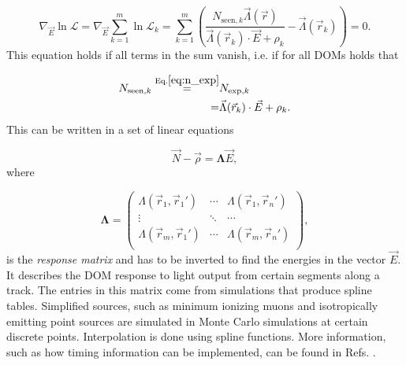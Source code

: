 \begin{equation}
\nabla_{\vec{E}} \ln \mathcal{L} = \nabla_{\vec{E}} \sum^m_{k=1} \ln \mathcal{L}_k = \sum^m_{k=1} \left(\frac{N_{\textrm{seen},k} \vec{\Lambda}(\vec{r})}{\vec{\Lambda}(\vec{r}_k) \cdot \vec{E} + \rho_k} - \vec{\Lambda}(\vec{r}_k) \right) = 0.
\end{equation}
\noindent This equation holds if all terms in the sum vanish, i.e. if for all DOMs holds that

\begin{equation}
\begin{split}
N_{\textrm{seen},k} \overset{\textrm{Eq.}\ref{eq:n_exp}}{=} &N_{\textrm{exp},k} \\
= &\vec{\Lambda}(\vec{r}_k) \cdot \vec{E} + \rho_k.
\end{split}
\end{equation}
\noindent This can be written in a set of linear equations

\begin{equation}
\vec{N} - \vec{\rho} = \mathbf{\Lambda} \vec{E}, 
\end{equation}
\noindent where

\begin{equation}
\mathbf{\Lambda} = 
\begin{pmatrix}
\Lambda(\vec{r}_1,\vec{r}_1') & \cdots & \Lambda(\vec{r}_1,\vec{r}_n')\\
\vdots  & \ddots & \cdots \\
\Lambda(\vec{r}_m,\vec{r}_1') & \cdots & \Lambda(\vec{r}_m,\vec{r}_n')\\
\end{pmatrix},
\end{equation}
\noindent is the \textit{response matrix} and has to be inverted to find the energies in the vector $\vec{E}$. It describes the DOM response to light output from certain segments along a track. The entries in this matrix come from simulations that produce spline tables. Simplified sources, such as minimum ionizing muons and isotropically emitting point sources are simulated in Monte Carlo simulations at certain discrete points. Interpolation is done using spline functions. More information, such as how timing information can be implemented, can be found in Refs. \cite{millipedeinternal,stefthesis}.


